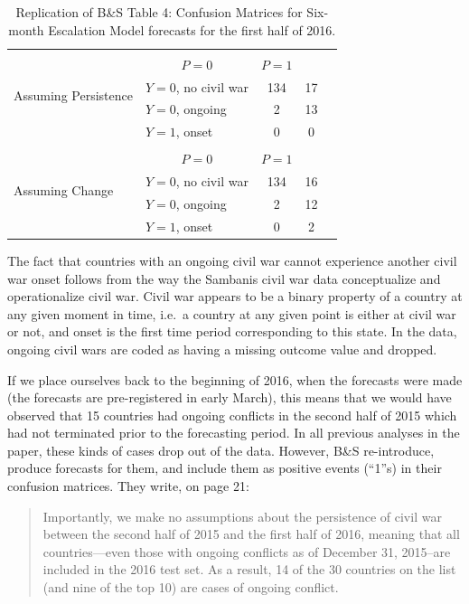 \documentclass[
]{article}
\begin{document}
\begin{table}
\caption{Replication of B\&S Table 4: Confusion Matrices for Six-month Escalation Model forecasts for the first half of 2016.}\label{tab:table4}
\centering
\begin{tabular}{ll|c|c|l}
\multicolumn{1}{l}{\multirow{5}{*}{Assuming Persistence}} & \multicolumn{3}{c}{} \\
\multicolumn{2}{c}{}& \multicolumn{1}{c}{$P=0$} & \multicolumn{1}{c}{$P=1$} \\
\cline{3-4}
& $Y=0$, no civil war & 134 & 17 \\
\cline{3-4}
& $Y=0$, ongoing & 2 & 13 \\
\cline{3-4}
& $Y=1$, onset & 0 & 0 \\
\cline{3-4}
\multicolumn{1}{l}{\multirow{5}{*}{Assuming Change}} & \multicolumn{3}{c}{} \\
\multicolumn{2}{c}{}& \multicolumn{1}{c}{$P=0$} & \multicolumn{1}{c}{$P=1$} \\
\cline{3-4}
& $Y=0$, no civil war & 134 & 16 \\
\cline{3-4}
& $Y=0$, ongoing & 2 & 12 \\
\cline{3-4}
& $Y=1$, onset & 0 & 2 \\
\cline{3-4}
\end{tabular}
\end{table}

The fact that countries with an ongoing civil war cannot experience another civil war onset follows from the way the Sambanis civil war data conceptualize and operationalize civil war. Civil war appears to be a binary property of a country at any given moment in time, i.e.~a country at any given point is either at civil war or not, and onset is the first time period corresponding to this state. In the data, ongoing civil wars are coded as having a missing outcome value and dropped.

If we place ourselves back to the beginning of 2016, when the forecasts were made (the forecasts are pre-registered in early March), this means that we would have observed that 15 countries had ongoing conflicts in the second half of 2015 which had not terminated prior to the forecasting period. In all previous analyses in the paper, these kinds of cases drop out of the data. However, B\&S re-introduce, produce forecasts for them, and include them as positive events (``1''s) in their confusion matrices. They write, on page 21:

\begin{quote}
Importantly, we make no assumptions about the persistence of civil war between the second half of 2015 and the first half of 2016, meaning that all countries---even those with ongoing conflicts as of December 31, 2015--are included in the 2016 test set. As a result, 14 of the 30 countries on the list (and nine of the top 10) are cases of ongoing conflict.
\end{quote}
\end{document}
